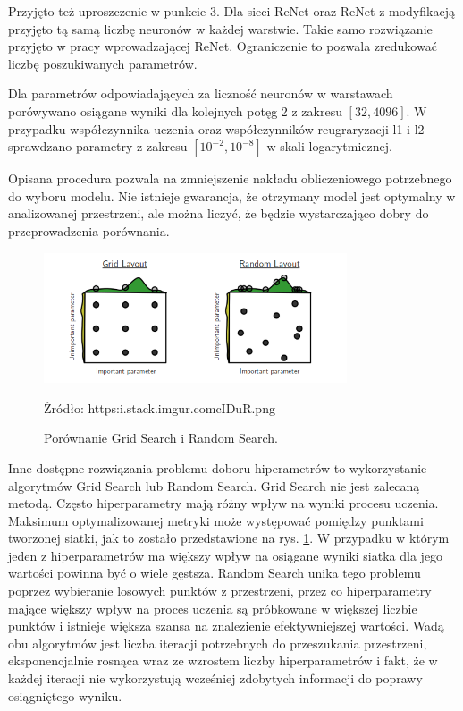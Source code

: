 \documentclass[oneside, mag]{mgr}
\begin{document}
Przyjęto też uproszczenie w punkcie 3. Dla sieci ReNet oraz ReNet z modyfikacją przyjęto tą samą liczbę neuronów w każdej warstwie. Takie samo rozwiązanie przyjęto w pracy wprowadzającej ReNet. Ograniczenie to pozwala zredukować liczbę poszukiwanych parametrów.

Dla parametrów odpowiadających za liczność neuronów w warstawach porówywano osiągane wyniki dla kolejnych potęg 2 z zakresu $[32, 4096]$. W przypadku współczynnika uczenia oraz współczynników reugraryzacji l1 i l2 sprawdzano parametry z zakresu $[10^{-2}, 10^{-8}]$ w skali logarytmicznej.

Opisana procedura pozwala na zmniejszenie nakładu obliczeniowego potrzebnego do wyboru modelu. Nie istnieje gwarancja, że otrzymany model jest optymalny w analizowanej przestrzeni, ale można liczyć, że będzie wystarczająco dobry do przeprowadzenia porównania.

\begin{figure}
\centering
	\includegraphics[width=0.8\textwidth]{img/grid_search.png}
	\caption{Porównanie Grid Search i Random Search.} Źródło: https:\/\/i.stack.imgur.com\/cIDuR.png
	\label{fig:hyperparams}
\end{figure}

Inne dostępne rozwiązania problemu doboru hiperametrów to wykorzystanie algorytmów Grid Search lub Random Search. Grid Search nie jest zalecaną metodą. Często hiperparametry mają różny wpływ na wyniki procesu uczenia. Maksimum optymalizowanej metryki może występować pomiędzy punktami tworzonej siatki, jak to zostało przedstawione na rys. \ref{fig:hyperparams}. W przypadku w którym jeden z hiperparametrów ma większy wpływ na osiągane wyniki siatka dla jego wartości powinna być o wiele gęstsza. Random Search unika tego problemu poprzez wybieranie losowych punktów z przestrzeni, przez co hiperparametry mające większy wpływ na proces uczenia są próbkowane w większej liczbie punktów i istnieje większa szansa na znalezienie efektywniejszej wartości. Wadą obu algorytmów jest liczba iteracji potrzebnych do przeszukania przestrzeni, eksponencjalnie rosnąca wraz ze wzrostem liczby hiperparametrów i fakt, że w każdej iteracji nie wykorzystują wcześniej zdobytych informacji do poprawy osiągniętego wyniku.
\end{document}
